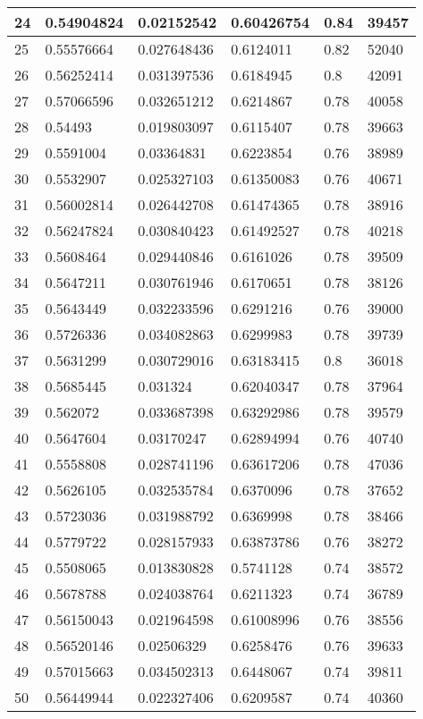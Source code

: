 \begin{longtable}{|l|l|l|l|l|l|}
24 & 0.54904824 & 0.02152542 & 0.60426754 & 0.84 & 39457 \\ \hline 
25 & 0.55576664 & 0.027648436 & 0.6124011 & 0.82 & 52040 \\ \hline 
26 & 0.56252414 & 0.031397536 & 0.6184945 & 0.8 & 42091 \\ \hline 
27 & 0.57066596 & 0.032651212 & 0.6214867 & 0.78 & 40058 \\ \hline 
28 & 0.54493 & 0.019803097 & 0.6115407 & 0.78 & 39663 \\ \hline 
29 & 0.5591004 & 0.03364831 & 0.6223854 & 0.76 & 38989 \\ \hline 
30 & 0.5532907 & 0.025327103 & 0.61350083 & 0.76 & 40671 \\ \hline 
31 & 0.56002814 & 0.026442708 & 0.61474365 & 0.78 & 38916 \\ \hline 
32 & 0.56247824 & 0.030840423 & 0.61492527 & 0.78 & 40218 \\ \hline 
33 & 0.5608464 & 0.029440846 & 0.6161026 & 0.78 & 39509 \\ \hline 
34 & 0.5647211 & 0.030761946 & 0.6170651 & 0.78 & 38126 \\ \hline 
35 & 0.5643449 & 0.032233596 & 0.6291216 & 0.76 & 39000 \\ \hline 
36 & 0.5726336 & 0.034082863 & 0.6299983 & 0.78 & 39739 \\ \hline 
37 & 0.5631299 & 0.030729016 & 0.63183415 & 0.8 & 36018 \\ \hline 
38 & 0.5685445 & 0.031324 & 0.62040347 & 0.78 & 37964 \\ \hline 
39 & 0.562072 & 0.033687398 & 0.63292986 & 0.78 & 39579 \\ \hline 
40 & 0.5647604 & 0.03170247 & 0.62894994 & 0.76 & 40740 \\ \hline 
41 & 0.5558808 & 0.028741196 & 0.63617206 & 0.78 & 47036 \\ \hline 
42 & 0.5626105 & 0.032535784 & 0.6370096 & 0.78 & 37652 \\ \hline 
43 & 0.5723036 & 0.031988792 & 0.6369998 & 0.78 & 38466 \\ \hline 
44 & 0.5779722 & 0.028157933 & 0.63873786 & 0.76 & 38272 \\ \hline 
45 & 0.5508065 & 0.013830828 & 0.5741128 & 0.74 & 38572 \\ \hline 
46 & 0.5678788 & 0.024038764 & 0.6211323 & 0.74 & 36789 \\ \hline 
47 & 0.56150043 & 0.021964598 & 0.61008996 & 0.76 & 38556 \\ \hline 
48 & 0.56520146 & 0.02506329 & 0.6258476 & 0.76 & 39633 \\ \hline 
49 & 0.57015663 & 0.034502313 & 0.6448067 & 0.74 & 39811 \\ \hline 
50 & 0.56449944 & 0.022327406 & 0.6209587 & 0.74 & 40360 \\ \hline 
\end{longtable}
